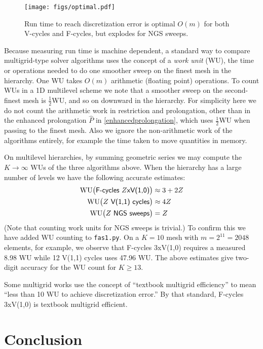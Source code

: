 \documentclass[letterpaper,final,12pt,reqno]{amsart}
\begin{document}
\begin{figure}
\texttt{[image: figs/optimal.pdf]}
\caption{Run time to reach discretization error is optimal $O(m)$ for both V-cycles and F-cycles, but explodes for NGS sweeps.}
\label{fig:optimal}
\end{figure}

Because measuring run time is machine dependent, a standard way to compare multigrid-type solver algorithms uses the concept of a \emph{work unit} (WU), the time or operations needed to do one smoother sweep on the finest mesh in the hierarchy.  One WU takes $O(m)$ arithmetic (floating point) operations.  To count WUs in a 1D multilevel scheme we note that a smoother sweep on the second-finest mesh is $\frac{1}{2}$WU, and so on downward in the hierarchy.  For simplicity here we do not count the arithmetic work in restriction and prolongation, other than in the enhanced prolongation $\hat P$ in \eqref{enhancedprolongation}, which uses $\frac{1}{2}$WU when passing to the finest mesh.  Also we ignore the non-arithmetic work of the algorithms entirely, for example the time taken to move quantities in memory.

On multilevel hierarchies, by summing geometric series \cite{Briggsetal2000} we may compute the $K\to\infty$ WUs of the three algorithms above.  When the hierarchy has a large number of levels we have the following accurate estimates:
\begin{align*}
\text{WU}\big(\text{\textsf{F-cycles $Z$xV(1,0)}}\big) &\approx 3+2Z \\
\text{WU}\big(\text{\textsf{$Z$ V(1,1) cycles}}\big)   &\approx 4Z \\
\text{WU}\big(\text{\textsf{$Z$ NGS sweeps}}\big)      &= Z
\end{align*}
(Note that counting work units for NGS sweeps is trivial.)  To confirm this we have added WU counting to \texttt{fas1.py}.  On a $K=10$ mesh with $m=2^{11}=2048$ elements, for example, we observe that \textsf{F-cycles 3xV(1,0)} requires a measured 8.98 WU while \textsf{12 V(1,1) cycles} uses 47.96 WU.  The above estimates give two-digit accuracy for the WU count for $K \ge 13$.

Some multigrid works \cite[for example]{BrownSmithAhmadia2013} use the concept of ``textbook multigrid efficiency'' to mean ``less than 10 WU to achieve discretization error.''  By that standard, \textsf{F-cycles 3xV(1,0)} is textbook multigrid efficient.


\section{Conclusion}  \label{sec:conclusion}
\end{document}
